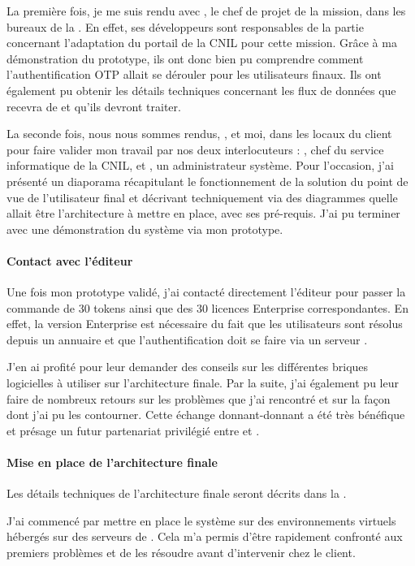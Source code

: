 La première fois, je me suis rendu avec \asegir{}, le chef de projet de la mission, dans les bureaux de la \abugan.
En effet, ses développeurs sont responsables de la partie concernant l'adaptation du portail \atypo{} de la CNIL pour cette mission.
Grâce à ma démonstration du prototype, ils ont donc bien pu comprendre comment l'authentification OTP allait se dérouler pour les utilisateurs finaux.
Ils ont également pu obtenir les détails techniques concernant les flux de données que \atypo{} recevra de \alinotp{} et qu'ils devront traiter.

La seconde fois, nous nous sommes rendus, \apakou, \asegir{} et moi, dans les locaux du client pour faire valider mon travail par nos deux interlocuteurs : \ahbt, chef du service informatique de la CNIL, et \amimiette, un administrateur système.
Pour l'occasion, j'ai présenté un diaporama récapitulant le fonctionnement de la solution du point de vue de l'utilisateur final et décrivant techniquement via des diagrammes quelle allait être l'architecture à mettre en place, avec ses pré-requis.
J'ai pu terminer avec une démonstration du système via mon prototype.

\paragraph{Contact avec l'éditeur}
Une fois mon prototype validé, j'ai contacté directement l'éditeur \alse{} pour passer la commande de 30 tokens ainsi que des 30 licences \alinotp{} Enterprise correspondantes.
En effet, la version Enterprise est nécessaire du fait que les utilisateurs sont résolus depuis un annuaire \aad{} et que l'authentification doit se faire via un serveur \aradius.

J'en ai profité pour leur demander des conseils sur les différentes briques logicielles à utiliser sur l'architecture finale.
Par la suite, j'ai également pu leur faire de nombreux retours sur les problèmes que j'ai rencontré et sur la façon dont j'ai pu les contourner.
Cette échange donnant-donnant a été très bénéfique et présage un futur partenariat privilégié entre \asmile{} et \alse{}.

\paragraph{Mise en place de l'architecture finale}
Les détails techniques de l'architecture finale seront décrits dans la .

J'ai commencé par mettre en place le système sur des environnements virtuels hébergés sur des serveurs de \asmile{}.
Cela m'a permis d'être rapidement confronté aux premiers problèmes et de les résoudre avant d'intervenir chez le client.

